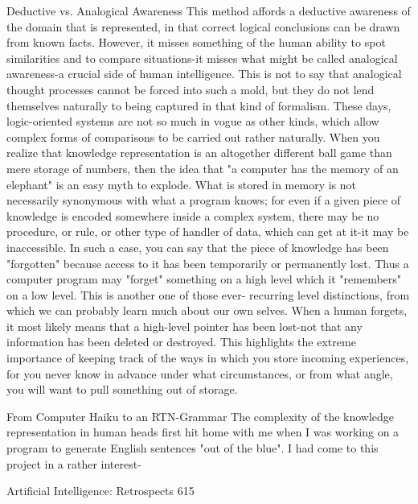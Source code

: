 {                       Deductive vs. Analogical Awareness
This method affords a deductive awareness of the domain that is represented, in that
correct logical conclusions can be drawn from known facts. However, it misses
something of the human ability to spot similarities and to compare situations-it misses
what might be called analogical awareness-a crucial side of human intelligence. This is
not to say that analogical thought processes cannot be forced into such a mold, but they
do not lend themselves naturally to being captured in that kind of formalism. These days,
logic-oriented systems are not so much in vogue as other kinds, which allow complex
forms of comparisons to be carried out rather naturally.
        When you realize that knowledge representation is an altogether different ball
game than mere storage of numbers, then the idea that "a computer has the memory of an
elephant" is an easy myth to explode. What is stored in memory is not necessarily
synonymous with what a program knows; for even if a given piece of knowledge is
encoded somewhere inside a complex system, there may be no procedure, or rule, or
other type of handler of data, which can get at it-it may be inaccessible. In such a case,
you can say that the piece of knowledge has been "forgotten" because access to it has
been temporarily or permanently lost. Thus a computer program may "forget" something
on a high level which it "remembers" on a low level. This is another one of those ever-
recurring level distinctions, from which we can probably learn much about our own
selves. When a human forgets, it most likely means that a high-level pointer has been
lost-not that any information has been deleted or destroyed. This highlights the extreme
importance of keeping track of the ways in which you store incoming experiences, for
you never know in advance under what circumstances, or from what angle, you will want
to pull something out of storage.

                 From Computer Haiku to an RTN-Grammar
The complexity of the knowledge representation in human heads first hit home with me
when I was working on a program to generate English sentences "out of the blue". I had
come to this project in a rather interest-




Artificial Intelligence: Retrospects                                                   615

}
